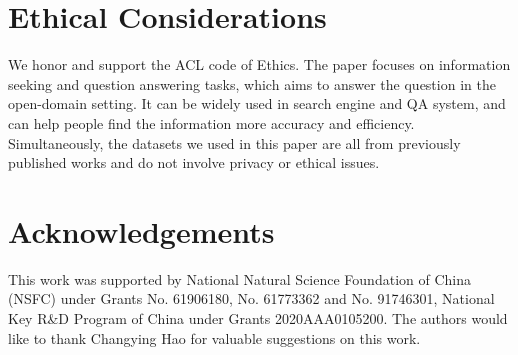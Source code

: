 \documentclass[11pt]{article}
\begin{document}
\section*{Ethical Considerations}
We honor and support the ACL code of Ethics. The paper focuses on information seeking and question answering tasks, which aims to answer the question in the open-domain setting. It can be widely used in search engine and QA system, and can help people find the information more accuracy and efficiency. Simultaneously, the datasets we used in this paper are all from previously published works and do not involve privacy or ethical issues.


\section*{Acknowledgements}
This work was supported by National Natural Science Foundation of China (NSFC) under Grants No. 61906180, No. 61773362 and No. 91746301, National Key R\&D Program of China under Grants 2020AAA0105200.
The authors would like to thank Changying Hao for valuable suggestions on this work.




\end{document}
